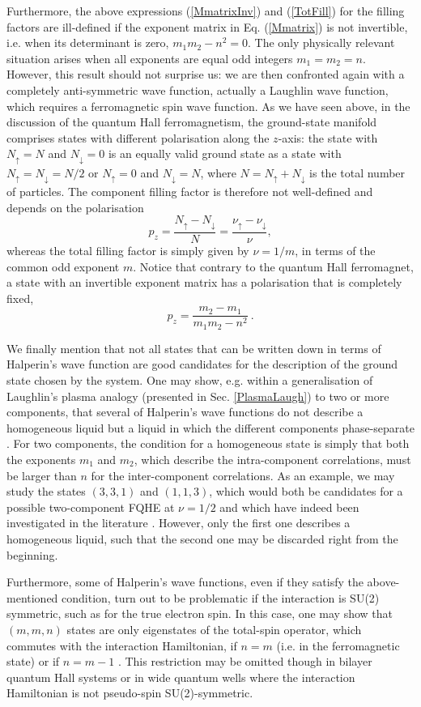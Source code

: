 \documentclass[10pt]{book}
\newcommand{\ua}{\uparrow}
\newcommand{\da}{\downarrow}
\newcommand{\beq}{\begin{equation}}
\newcommand{\eeq}{\end{equation}}
\begin{document}
Furthermore, the above expressions (\ref{MmatrixInv}) and (\ref{TotFill}) for the filling factors
are ill-defined if the exponent matrix in Eq. (\ref{Mmatrix}) is not
invertible, i.e. when its determinant is zero, $m_1m_2-n^2=0$. The only physically relevant situation arises when 
all exponents are equal odd integers $m_1=m_2=n$. However, this result should not surprise us: we are then confronted again
with a completely anti-symmetric wave function, actually a Laughlin wave function, which requires a ferromagnetic spin
wave function. As we have seen above, in the discussion of the quantum Hall ferromagnetism, the ground-state manifold 
comprises states with different polarisation along the $z$-axis: the state with $N_{\ua}=N$ and $N_{\da}=0$ is an 
equally valid ground state as a state with $N_{\ua}=N_{\da}=N/2$ or $N_{\ua}=0$ and $N_{\da}=N$, where
$N=N_{\ua}+N_{\da}$ is the total number of particles. The component
filling factor is therefore not well-defined and depends on the polarisation 
\beq\label{Polarisation}
p_z=\frac{N_{\ua}-N_{\da}}{N}=\frac{\nu_{\ua}-\nu_{\da}}{\nu},
\eeq
whereas the total filling factor is simply given by $\nu=1/m$, in terms of the common odd exponent $m$. Notice that
contrary to the quantum Hall ferromagnet, a state with an invertible exponent matrix has a polarisation that is completely fixed, 
\beq\label{Polarisation2}
p_z=\frac{m_2-m_1}{m_1m_2-n^2}\ .
\eeq

We finally mention that not all states that can be written down in terms of Halperin's wave function are good candidates for the
description of the ground state chosen by the system. One may show, e.g. within a generalisation of Laughlin's plasma analogy
(presented in Sec. \ref{PlasmaLaugh}) to two or more components, that several of Halperin's wave functions do not describe
a homogeneous liquid but a liquid in which the different components phase-separate \cite{dGRG}. For two components, the condition
for a homogeneous state is simply that both the exponents $m_1$ and $m_2$, which describe the intra-component correlations, must be larger
than $n$ for the inter-component correlations. As an example, we may study the states $(3,3,1)$ and $(1,1,3)$, which would both
be candidates for a possible two-component FQHE at $\nu=1/2$ and which have indeed been investigated in the literature
\cite{MDYG}. However, only the first one describes a homogeneous liquid, such that the second one may be discarded right from
the beginning.

Furthermore, some of Halperin's wave functions, even if they satisfy the above-mentioned condition, turn out to be problematic
if the interaction is SU(2) symmetric, such as for the true electron spin. In this case, one may show that $(m,m,n)$ states
are only eigenstates of the total-spin operator, which commutes with the interaction Hamiltonian, if $n=m$ (i.e. in the
ferromagnetic state) or if $n=m-1$ \cite{PG}. This restriction may be omitted though in bilayer quantum Hall systems 
or in wide quantum wells where the interaction Hamiltonian is not pseudo-spin SU(2)-symmetric. 
\end{document}

